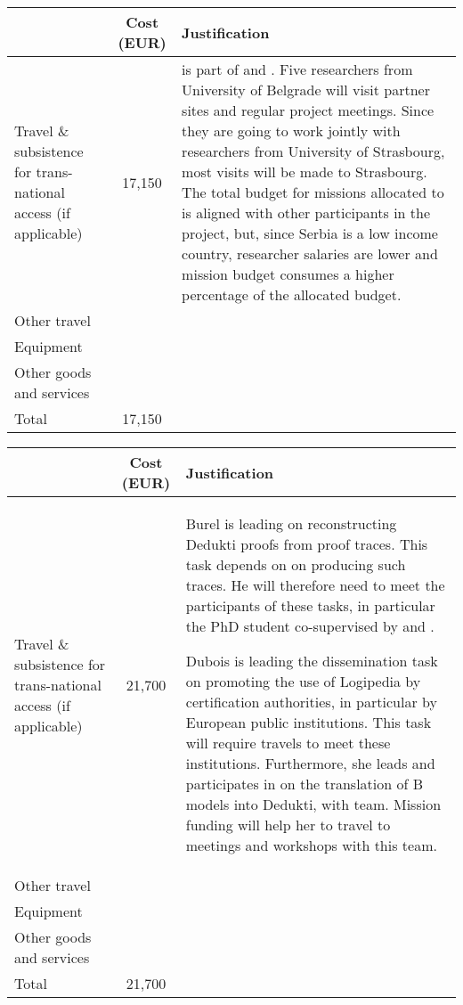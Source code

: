 \begin{longtable*}{|p{.25\textwidth}|c|p{0.55\textwidth}|}
\hline
   & Cost (EUR)  & Justification \\
  \hline
  Travel \& subsistence for trans-national access (if applicable) & 17,150 &

is part of  and .
Five researchers from University of Belgrade will visit partner sites
and regular project meetings. Since they are going to work jointly
with researchers from University of Strasbourg, most visits will be
made to Strasbourg. The total budget for missions allocated to
 is aligned with other participants in the
project, but, since Serbia is a low income country, researcher salaries
are lower and mission budget consumes a higher percentage of the
allocated budget.
  \\
  \hline
  Other travel & & \\
  \hline
  Equipment & & \\
  \hline
  Other goods and services & & \\
  \hline
  Total & 17,150 & \\
  \hline
\end{longtable*}

\begin{longtable*}{|p{.25\textwidth}|c|p{0.55\textwidth}|}
\hline
   & Cost (EUR)  & Justification \\
  \hline
  Travel \& subsistence for trans-national access (if applicable) & 21,700 &

  Burel is leading  on
reconstructing Dedukti proofs from proof traces. This task depends on
 on producing such traces. He will
therefore need to meet the participants of these tasks, in particular
the PhD student co-supervised by  and .

Dubois is leading the dissemination task  on promoting the use of Logipedia by certification authorities, in particular by European public institutions. This task will require travels to meet these institutions. Furthermore, she leads and participates in  on the translation of B models into Dedukti, with  team. Mission funding will help her to travel to meetings and workshops with this team.\\
  \hline
  Other travel & & \\
  \hline
  Equipment & & \\
  \hline
  Other goods and services & & \\
  \hline
  Total & 21,700 & \\
  \hline
\end{longtable*}

